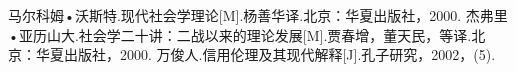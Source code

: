 \newpage
{}

\begin{thebibliography}{99}
		马尔科姆•沃斯特.现代社会学理论[M].杨善华译.北京：华夏出版社，2000.
		杰弗里•亚历山大.社会学二十讲：二战以来的理论发展[M].贾春增，董天民，等译.北京：华夏出版社，2000.
		万俊人.信用伦理及其现代解释[J].孔子研究，2002，(5).
\end{thebibliography}
